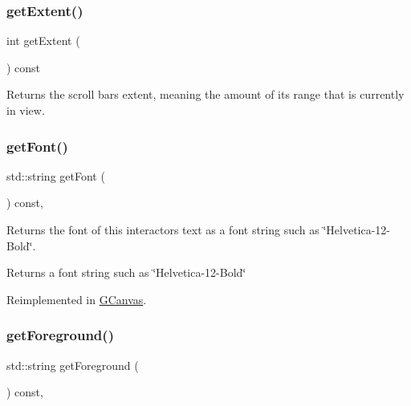 \subsubsection{\texorpdfstring{get\+Extent()}{getExtent()}}
{\footnotesize\ttfamily int get\+Extent (\begin{DoxyParamCaption}{ }\end{DoxyParamCaption}) const\hspace{0.3cm}{\ttfamily [virtual]}}



Returns the scroll bar\textquotesingle{}s extent, meaning the amount of its range that is currently in view. 

\mbox{\label{classGInteractor_a894a5502900794eeb27d084c21f1d77d}} 
\subsubsection{\texorpdfstring{get\+Font()}{getFont()}}
{\footnotesize\ttfamily std\+::string get\+Font (\begin{DoxyParamCaption}{ }\end{DoxyParamCaption}) const\hspace{0.3cm}{\ttfamily [virtual]}, {\ttfamily [inherited]}}



Returns the font of this interactor\textquotesingle{}s text as a font string such as \char`\"{}\+Helvetica-\/12-\/\+Bold\char`\"{}. 

\begin{DoxyReturn}{Returns}
a font string such as \char`\"{}\+Helvetica-\/12-\/\+Bold\char`\"{} 
\end{DoxyReturn}


Reimplemented in \mbox{\hyperlink{classGCanvas_aa0829769ac6325b5c58d27c8e363cb78}{G\+Canvas}}.

\mbox{\label{classGInteractor_a4fa2d8b0192a3a5b4af4bbfe71194d03}} 
\subsubsection{\texorpdfstring{get\+Foreground()}{getForeground()}}
{\footnotesize\ttfamily std\+::string get\+Foreground (\begin{DoxyParamCaption}{ }\end{DoxyParamCaption}) const\hspace{0.3cm}{\ttfamily [virtual]}, {\ttfamily [inherited]}}




